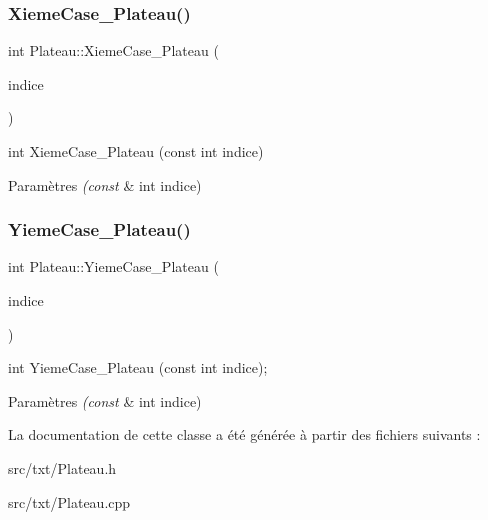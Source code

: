 \subsubsection{\texorpdfstring{Xieme\+Case\+\_\+\+Plateau()}{XiemeCase\_Plateau()}}
{\footnotesize\ttfamily int Plateau\+::\+Xieme\+Case\+\_\+\+Plateau (\begin{DoxyParamCaption}\item[{const int}]{indice }\end{DoxyParamCaption})}



int Xieme\+Case\+\_\+\+Plateau (const int indice) 


\begin{DoxyParams}{Paramètres}
{\em (const} & int indice) \\
\hline
\end{DoxyParams}
\mbox{\label{classPlateau_ac99c2bfea8d60469bac93f7b10863475}} 
\subsubsection{\texorpdfstring{Yieme\+Case\+\_\+\+Plateau()}{YiemeCase\_Plateau()}}
{\footnotesize\ttfamily int Plateau\+::\+Yieme\+Case\+\_\+\+Plateau (\begin{DoxyParamCaption}\item[{const int}]{indice }\end{DoxyParamCaption})}



int Yieme\+Case\+\_\+\+Plateau (const int indice); 


\begin{DoxyParams}{Paramètres}
{\em (const} & int indice) \\
\hline
\end{DoxyParams}


La documentation de cette classe a été générée à partir des fichiers suivants \+:\begin{DoxyCompactItemize}
\item 
src/txt/Plateau.\+h\item 
src/txt/Plateau.\+cpp\end{DoxyCompactItemize}
